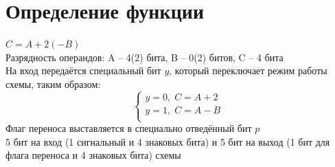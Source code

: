 \documentclass[12pt,a4paper]{report}
\begin{document}
\section*{Определение функции}
$C=A+2(-B)$\\
Разрядность операндов: A -- 4(2) бита, B -- 0(2) битов, C -- 4 бита\\
На вход передаётся специальный бит $y$, который переключает режим работы схемы, таким образом:
\begin{equation*}
    \begin{cases}
        y=0,\;C=A+2\\
        y=1,\;C=A-B\\
    \end{cases}
\end{equation*}
Флаг переноса выставляется в специально отведённый бит $p$\\
5 бит на вход (1 сигнальный и 4 знаковых бита) и 5 бит на выход (1 бит для флага переноса и 4 знаковых бита) схемы
\end{document}
